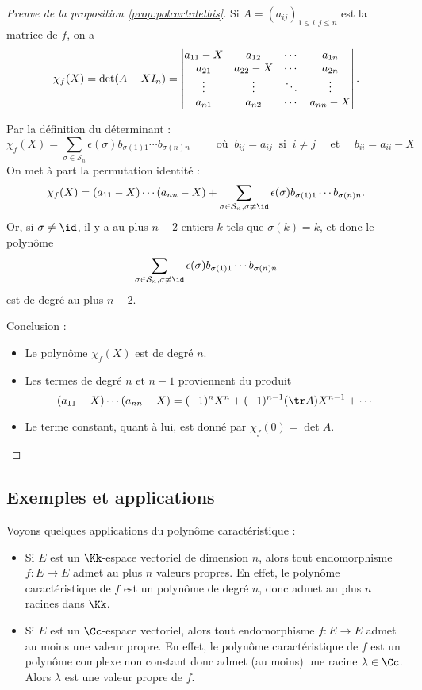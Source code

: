 \documentclass[12pt, class=report,crop=false]{standalone}
\begin{document}



\begin{proof}[Preuve de la proposition \ref{prop:polcartrdetbis}]
Si $A=(a_{ij})_{1\le i,j\le n}$ est la matrice de $f$, on a
$$\chi_f(X) = \det(A-XI_n) 
= \begin{vmatrix}
a_{11}-X&a_{12}&\cdots&a_{1n}\cr 
a_{21}&a_{22}-X& \cdots &a_{2n} \cr
\vdots&\vdots&\ddots & \vdots\cr
a_{n1}&a_{n2}&\cdots&a_{nn}-X
\end{vmatrix}.$$

Par la définition du déterminant :
$$\chi_f(X) = \sum_{\sigma\in \mathcal{S}_n}\epsilon(\sigma)b_{\sigma(1)1}\cdots b_{\sigma(n)n}
\qquad  \text{ où } \  b_{ij}=a_{ij} \ \text{ si } \ i\neq j \quad \text{ et } \quad b_{ii}=a_{ii}-X$$
On met à part la permutation identité :
$$\chi_f(X) = (a_{11}-X)\cdots(a_{nn}-X)
+\sum_{\sigma\in \mathcal{S}_n,\sigma\neq\id}\epsilon(\sigma)b_{\sigma(1)1}\cdots b_{\sigma(n)n}.$$
Or, si $\sigma\neq\id$, il y a au plus $n-2$ entiers $k$ tels que $\sigma(k)=k$, et donc le polynôme
$$\sum_{\sigma\in \mathcal{S}_n,\sigma\neq\id}\epsilon(\sigma)b_{\sigma(1)1}\cdots b_{\sigma(n)n}$$
est de degré au plus $n-2$.

Conclusion :
\begin{itemize}
  \item Le polynôme $\chi_f(X)$ est de degré $n$.
  \item Les termes de degré $n$ et $n-1$ proviennent du produit 
$$(a_{11}-X)\cdots(a_{nn}-X)=(-1)^nX^n+(-1)^{n-1}(\tr A)X^{n-1}+\cdots$$   
  \item Le terme constant, quant à lui, est donné par $\chi_f(0)=\det A$.
\end{itemize}
\end{proof}

\subsection{Exemples et applications}

Voyons quelques applications du polynôme caractéristique :

\begin{itemize}  
  \item Si $E$ est un $\Kk$-espace vectoriel de dimension $n$, alors tout endomorphisme $f :  E \to E$ admet au plus $n$ valeurs propres. En effet, le polynôme caractéristique de $f$ est un polynôme de degré $n$, donc admet au plus $n$ racines dans $\Kk$.

  \item Si $E$ est un $\Cc$-espace vectoriel, alors tout endomorphisme $f :  E \to E$ admet  au moins une valeur propre. En effet, le polynôme caractéristique de $f$ est un polynôme complexe non constant donc admet (au moins) une racine $\lambda\in \Cc$. Alors $\lambda$ est une valeur propre de $f$.
\end{itemize} 
\end{document}
